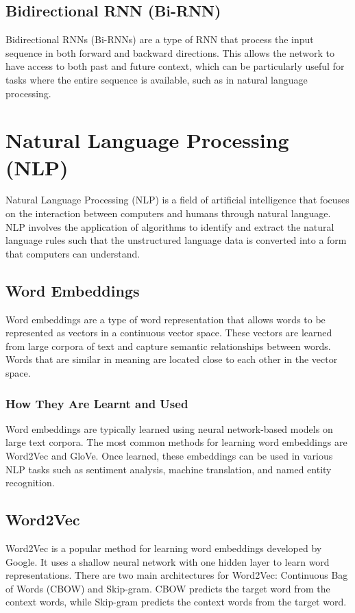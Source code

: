 \documentclass[12pt]{article}
\begin{document}
\subsection{Bidirectional RNN (Bi-RNN)}
Bidirectional RNNs (Bi-RNNs) are a type of RNN that process the input sequence in both forward and backward directions. This allows the network to have access to both past and future context, which can be particularly useful for tasks where the entire sequence is available, such as in natural language processing.

\section{Natural Language Processing (NLP)}
Natural Language Processing (NLP) is a field of artificial intelligence that focuses on the interaction between computers and humans through natural language. NLP involves the application of algorithms to identify and extract the natural language rules such that the unstructured language data is converted into a form that computers can understand.

\subsection{Word Embeddings}
Word embeddings are a type of word representation that allows words to be represented as vectors in a continuous vector space. These vectors are learned from large corpora of text and capture semantic relationships between words. Words that are similar in meaning are located close to each other in the vector space.

\subsubsection{How They Are Learnt and Used}
Word embeddings are typically learned using neural network-based models on large text corpora. The most common methods for learning word embeddings are Word2Vec and GloVe. Once learned, these embeddings can be used in various NLP tasks such as sentiment analysis, machine translation, and named entity recognition.

\subsection{Word2Vec}
Word2Vec is a popular method for learning word embeddings developed by Google. It uses a shallow neural network with one hidden layer to learn word representations. There are two main architectures for Word2Vec: Continuous Bag of Words (CBOW) and Skip-gram. CBOW predicts the target word from the context words, while Skip-gram predicts the context words from the target word.
\end{document}
